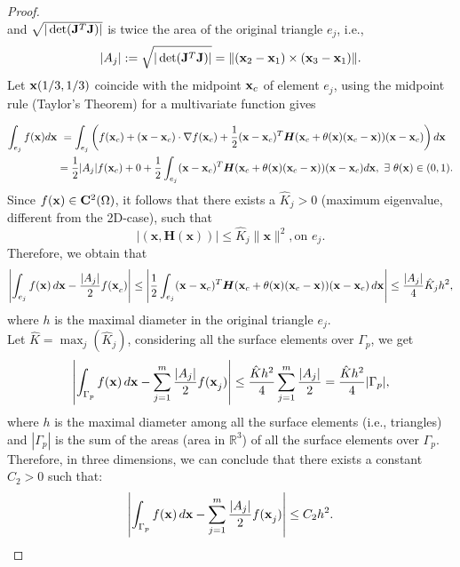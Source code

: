 \documentclass[pdflatex,sn-mathphys-num]{sn-jnl}
\newtheorem*{lemma star}{Lemma}
\begin{document}
\begin{proof}
\begin{equation*}
\end{equation*}
and $\sqrt{| \det({\bf{J}}^T {\bf{J}})|}$ is twice the area of the original triangle $e_j$, i.e.,
\begin{equation*}
    |A_j| := \sqrt{| \det({\bf{J}}^T {\bf{J}})|} = \|({\bf{x}}_2 - {\bf{x}}_1) \times ({\bf{x}}_3 - {\bf{x}}_1)\|.
\end{equation*}
Let ${\bf{x}}(1/3, 1/3)$ coincide with the midpoint ${\bf{x}}_c$ of element $e_j$, using the midpoint rule (Taylor's Theorem) for a multivariate function gives


\begin{align*}
    \int_{e_j} f(\mathbf{x})d{\mathbf {x}} &~  
    = \int_{e_j} \left(f({\bf{x}}_c) + ({\bf{x}} - {\bf{x}}_c) \cdot \nabla {f}({\bf{x}}_c) + \frac{1}{2} ({\bf{x}} - {\bf{x}}_c)^T {\boldsymbol{H}}({\bf{x}}_c + \theta({\bf x}) ({\bf{x}}_c - {\bf{x}})) ({\bf{x}} - \mathbf {x}_c) \right) d{\mathbf {x}} \\
 &=  \frac{1}{2} |A_j| f({\bf{x}}_c) + 0 + \frac{1}{2} \int_{e_j}({\bf{x}} - {\bf{x}}_c)^T {\boldsymbol{H}}({\bf{x}}_c + \theta({\bf x}) ({\bf{x}}_c - {\bf{x}})) ({\bf{x}} - \mathbf {x}_c) d{\mathbf {x}}, ~ \exists ~ \theta({\bf x}) \in (0,1). 
\end{align*}
Since $f(\mathbf{x}) \in {\bf C}^2(\Omega)$, it follows that there exists a $\hat{K}_j>0$ (maximum eigenvalue, different from the 2D-case), such that
\begin{equation*}
\big|{({\mathbf x},{\boldsymbol H}({\mathbf x}))}\big|\leq \hat{K}_j\parallel\mathbf{x}\parallel^2, \text{on } e_j.
\end{equation*}
Therefore, we obtain that
\[
\left| \int_{e_j} f{\bf{(x)}} \, d{\bf{x}} - \frac{ |A_j|}{2} f{\bf{(x}}_c) \right| \leq \left| \frac{ 1}{2} \int_{e_j} ({\bf{x}} - {\bf{x}}_c)^T {\boldsymbol{H}}({\bf{x}}_c + \theta({\bf x}) ({\bf{x}}_c - {\bf{x}})) ({\bf{x}} - \mathbf {x}_c) \,d{\mathbf {x}} \right| \leq \frac{ |A_j|}{4}\hat{K}_j{h^2},
\]
where $h$ is the maximal diameter in the original triangle $e_j$. \\
Let $\hat{K} = \max_j (\hat{K}_j)$, considering all the surface elements over $\Gamma_p$, we get
\[
\left| \int_{\Gamma_p} f{\bf{(x}}) \, d{\bf{x}} - \sum_{j=1}^{m} \frac{|A_j|}{2} f{\bf{(x}}_j) \right| \leq \frac{\hat{K} {h^2}}{4} \sum_{j=1}^{m} \frac{ |A_j|}{2} = \frac{\hat{K} {h^2}}{4} |\Gamma_p|,
\]
where $h$ is the maximal diameter among all the surface elements (i.e., triangles) and $|\Gamma_p|$ is the sum of the areas (area in $\mathbb{R}^3$) of all the surface elements over $\Gamma_p$. Therefore, in three dimensions, we can conclude that there exists a constant $C_2 > 0$ such that:
\[
\left| \int_{\Gamma_p} f{\bf{(x}}) \, d{\bf{x}} - \sum_{j=1}^{m} \frac{|A_j|}{2} f{\bf{(x}}_j) \right| \leq {C_2}{h^2}.
\] 
\end{proof}
\end{document}
